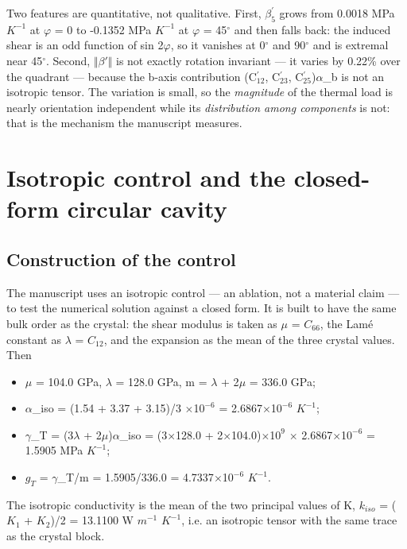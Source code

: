 \documentclass[preprint,12pt]{elsarticle}
\begin{document}
Two features are quantitative, not qualitative. First, $\beta ^{\prime}_{5}$ grows from 0.0018 MPa $K^{-1}$ at $\varphi$ = 0 to -0.1352 MPa $K^{-1}$ at $\varphi$ = 45$^{\circ}$ and then falls back: the induced shear is an odd function of sin 2$\varphi$, so it vanishes at 0$^{\circ}$ and 90$^{\circ}$ and is extremal near 45$^{\circ}$. Second, $\Vert \beta '\Vert$ is not exactly rotation invariant --- it varies by 0.22\% over the quadrant --- because the b-axis contribution (C$^{\prime}_{12}$, C$^{\prime}_{23}$, C$^{\prime}_{25}$)$\alpha$\_b is not an isotropic tensor. The variation is small, so the \emph{magnitude} of the thermal load is nearly orientation independent while its \emph{distribution among components} is not: that is the mechanism the manuscript measures.

\section{Isotropic control and the closed-form circular cavity}
\label{sec:4}

\subsection{Construction of the control}
\label{sec:4.1}

The manuscript uses an isotropic control --- an ablation, not a material claim --- to test the numerical solution against a closed form. It is built to have the same bulk order as the crystal: the shear modulus is taken as $\mu$ = $C_{66}$, the Lam\'e constant as $\lambda$ = $C_{12}$, and the expansion as the mean of the three crystal values. Then

\begin{itemize}
\item $\mu$ = 104.0 GPa, $\lambda$ = 128.0 GPa, m = $\lambda$ + 2$\mu$ = 336.0 GPa;
\item $\alpha$\_iso = (1.54 + 3.37 + 3.15)/3 $\times$1$0^{-6}$ = 2.6867$\times$1$0^{-6}$ $K^{-1}$;
\item $\gamma$\_T = (3$\lambda$ + 2$\mu$)$\alpha$\_iso = (3$\times$128.0 + 2$\times$104.0)$\times$1$0^{9}$ $\times$ 2.6867$\times$1$0^{-6}$ = 1.5905 MPa $K^{-1}$;
\item $g_{T}$ = $\gamma$\_T/m = 1.5905/336.0 = 4.7337$\times$1$0^{-6}$ $K^{-1}$.
\end{itemize}

The isotropic conductivity is the mean of the two principal values of K, $k_{iso}$ = ($K_{1}$ + $K_{2}$)/2 = 13.1100 W $m^{-1}$ $K^{-1}$, i.e. an isotropic tensor with the same trace as the crystal block.
\end{document}
